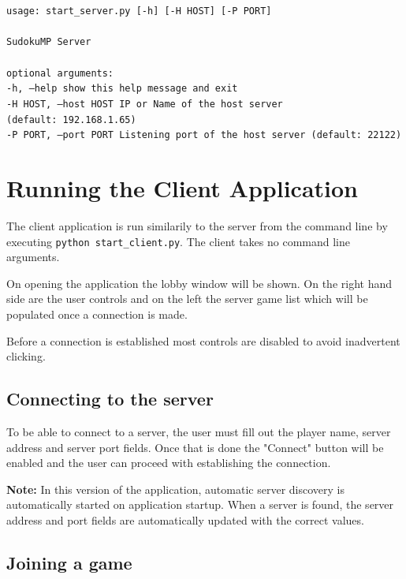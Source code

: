 \documentclass[a4paper]{article}
\begin{document}
\texttt{usage: start\_server.py [-h] [-H HOST] [-P PORT]\\
~\\
SudokuMP Server\\
~\\
optional arguments:\\
-h, --help            show this help message and exit\\
-H HOST, --host HOST  IP or Name of the host server (default:\ 192.168.1.65)\\
-P PORT, --port PORT  Listening port of the host server (default:\ 22122)
}

\hrulefill


\section{Running the Client Application}

The client application is run similarily to the server from the command line by executing \texttt{python start\_client.py}. The client takes no command line arguments.

On opening the application the lobby window will be shown. On the right hand side are the user controls and on the left the server game list which will be populated once a connection is made.

Before a connection is established most controls are disabled to avoid inadvertent clicking.


\subsection{Connecting to the server}

To be able to connect to a server, the user must fill out the player name, server address and server port fields. Once that is done the "Connect" button will be enabled and the user can proceed with establishing the connection.

\textbf{Note:} In this version of the application, automatic server discovery is automatically started on application startup. When a server is found, the server address and port fields are automatically updated with the correct values.

\subsection{Joining a game}
\end{document}
